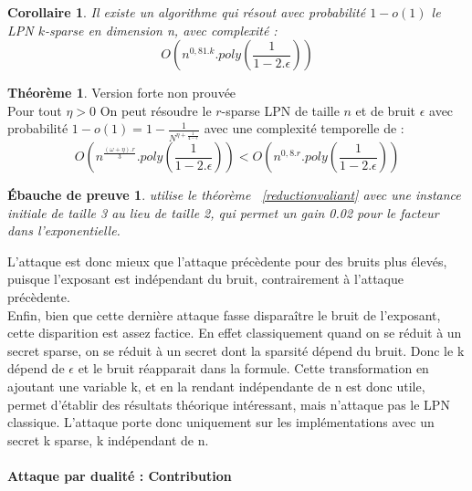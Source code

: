 \documentclass{article}		%
\theoremstyle{definition}
\newtheorem{theo}{Théorème}
\theoremstyle{plain}
\newtheorem{intui}{Ébauche de preuve}
\theoremstyle{plain}
\newtheorem{coro}{Corollaire}
\theoremstyle{plain}
\theoremstyle{plain}
\begin{document}
\begin{coro}
Il existe un algorithme qui résout avec probabilité $1-o(1)$ le LPN $k$-sparse en dimension n, avec
complexité :
$$O(n^{0,81.k}.poly(\frac{1}{1-2.\epsilon}))$$
\end{coro}

\begin{theo}{Version forte non prouvée}
\\
Pour tout $\eta>0$
On peut résoudre le $r$-sparse LPN de taille $n$ et de bruit $\epsilon$
avec probabilité $1-o(1)=1-\frac{1}{N^{\eta+\frac{1}{4-\epsilon}}}$ avec une complexité temporelle de :
$$O(n^{\frac{(\omega+\eta).r}{3}}.poly(\frac{1}{1-2.\epsilon}))<
O(n^{0,8.r}.poly(\frac{1}{1-2.\epsilon}))$$
\end{theo}
\begin{intui}
\cite{Valiant} utilise le théorème ~\ref{reductionvaliant} avec une instance
initiale de taille 3 au lieu de taille 2, qui permet un gain 0.02 pour le
facteur dans
l'exponentielle.
\end{intui}

L'attaque est donc mieux que l'attaque précèdente pour
des bruits plus élevés, puisque l'exposant est indépendant du bruit,
contrairement à l'attaque précèdente.
\\
Enfin, bien que cette dernière attaque fasse disparaître le bruit de
l'exposant, cette disparition est assez factice. En effet
classiquement quand on se réduit à un secret sparse, on se réduit à un
secret dont la sparsité dépend du bruit. Donc le k dépend de $\epsilon$
et le bruit réapparait dans la formule. Cette transformation en ajoutant
une variable k, et en la rendant indépendante de n est donc utile, permet
d'établir des résultats théorique intéressant, mais n'attaque pas le LPN
classique. L'attaque porte donc uniquement sur les implémentations avec
un secret k sparse, k indépendant de n. 

\paragraph{Attaque par dualité : Contribution} 
\end{document}
